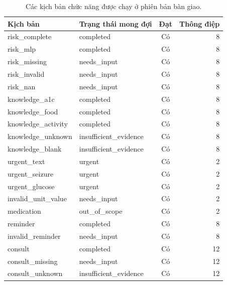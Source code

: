 \begin{table}[H]\centering\small
\caption{Các kịch bản chức năng được chạy ở phiên bản bàn giao.}
\begin{tabular}{@{}llcr@{}}\toprule
Kịch bản & Trạng thái mong đợi & Đạt & Thông điệp \\\midrule
risk\_complete & completed & Có & 8 \\
risk\_mlp & completed & Có & 8 \\
risk\_missing & needs\_input & Có & 8 \\
risk\_invalid & needs\_input & Có & 8 \\
risk\_nan & needs\_input & Có & 8 \\
knowledge\_a1c & completed & Có & 8 \\
knowledge\_food & completed & Có & 8 \\
knowledge\_activity & completed & Có & 8 \\
knowledge\_unknown & insufficient\_evidence & Có & 8 \\
knowledge\_blank & insufficient\_evidence & Có & 8 \\
urgent\_text & urgent & Có & 2 \\
urgent\_seizure & urgent & Có & 2 \\
urgent\_glucose & urgent & Có & 2 \\
invalid\_unit\_value & needs\_input & Có & 2 \\
medication & out\_of\_scope & Có & 2 \\
reminder & completed & Có & 8 \\
invalid\_reminder & needs\_input & Có & 8 \\
consult & completed & Có & 12 \\
consult\_missing & needs\_input & Có & 12 \\
consult\_unknown & insufficient\_evidence & Có & 12 \\
\bottomrule\end{tabular}
\end{table}
